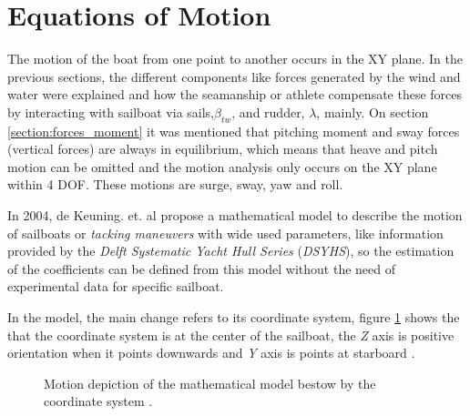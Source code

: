 \section{Equations of Motion}
The motion of the boat from one point to another occurs in the XY plane. In the previous sections, the different components like forces generated by the wind and water were explained and how the seamanship or athlete compensate these forces by interacting with sailboat via sails,$\beta_{tw}$, and rudder, $\lambda$, mainly. On section \ref{section:forces_moment} 
it was mentioned that pitching moment and sway forces (vertical forces) are always in equilibrium, which means that heave and  pitch  motion can be omitted and the motion analysis only occurs on the XY plane within 4 DOF. These motions are surge, sway, yaw and roll.\par 

In 2004, de Keuning. et. al \cite{keuning2004mathematical} propose a mathematical model to describe the motion of sailboats or \textit{tacking maneuvers} with wide used parameters, like information provided by the \textit{Delft Systematic Yacht Hull Series} (\textit{DSYHS}), so the estimation of the coefficients can be defined from this model without the need of experimental data for specific sailboat. \par 

In the model, the main change refers to its coordinate system, figure \ref{fig:csys_tackmodel} shows the that the coordinate system is at the center of the sailboat, the \textit{Z} axis is positive orientation when it points downwards and \textit{Y} axis is points at starboard \cite{keuning2004mathematical}. \par

\begin{figure} %
  \centering
  \hfill
  \caption{Motion depiction of the mathematical model bestow by the coordinate system \cite{keuning2004mathematical}.}
\label{fig:csys_tackmodel} 
\end{figure}

